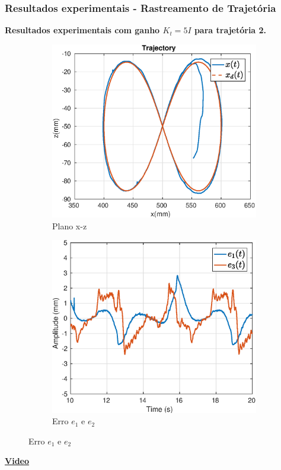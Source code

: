 \documentclass{beamer}
\begin{document}
\begin{frame}
\frametitle{Resultados experimentais - Rastreamento de Trajetória}
\textbf{Resultados experimentais com ganho $K_t = 5 I$ para trajetória 2.}
\begin{figure}[H]
\centering
\begin{subfigure}{.5\textwidth}
  \centering
  \includegraphics[width=\linewidth]{./img/traj_2_k5/traj.eps}
  \caption{Plano x-z}
\end{subfigure}%
\begin{subfigure}{.5\textwidth}
  \centering
  \includegraphics[width=\linewidth]{./img/traj_2_k5/error.eps}
  \caption{Erro $e_1$ e $e_2$}
\end{subfigure}
\end{figure}%
\begin{center}
\href{run:./videos/traj2.mp4}{\textbf{Video}}%
\end{center}
\end{frame}
\end{document}
